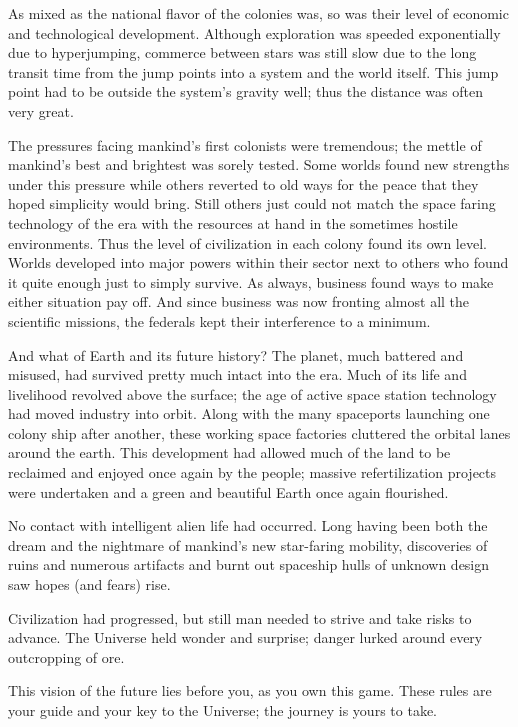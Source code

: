 As mixed as the national flavor of the colonies was, so was their
level of economic and technological development.  Although exploration
was speeded exponentially due to hyperjumping, commerce between stars
was still slow due to the long transit time from the jump points into
a system and the world itself.  This jump point had to be outside the
system's gravity well; thus the distance was often very great.

The pressures facing mankind's first colonists were tremendous; the
mettle of mankind's best and brightest was sorely tested.  Some worlds
found new strengths under this pressure while others reverted to old
ways for the peace that they hoped simplicity would bring.  Still
others just could not match the space faring technology of the era
with the resources at hand in the sometimes hostile environments.
Thus the level of civilization in each colony found its own level.
Worlds developed into major powers within their sector next to others
who found it quite enough just to simply survive.  As always, business
found ways to make either situation pay off.  And since business was
now fronting almost all the scientific missions, the federals kept
their interference to a minimum.


And what of Earth and its future history? The planet, much battered
and misused, had survived pretty much intact into the era.  Much of
its life and livelihood revolved above the surface; the age of active
space station technology had moved industry into orbit.  Along with
the many spaceports launching one colony ship after another, these
working space factories cluttered the orbital lanes around the earth.
This development had allowed much of the land to be reclaimed and
enjoyed once again by the people; massive refertilization projects
were undertaken and a green and beautiful Earth once again flourished.

No contact with intelligent alien life had occurred.  Long having been
both the dream and the nightmare of mankind's new star-faring
mobility, discoveries of ruins and numerous artifacts and burnt out
spaceship hulls of unknown design saw hopes (and fears) rise.


Civilization had progressed, but still man needed to strive and take
risks to advance.  The Universe held wonder and surprise; danger
lurked around every outcropping of ore.

This vision of the future lies before you, as you own this game.
These rules are your guide and your key to the Universe; the journey
is yours to take.


